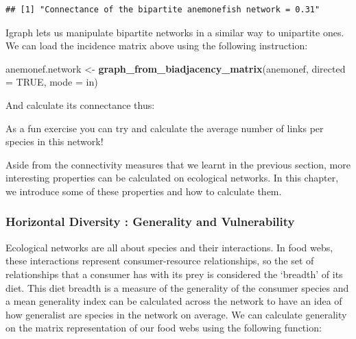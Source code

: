 \documentclass[
]{article}
\newenvironment{Shaded}{\begin{snugshade}}{\end{snugshade}}
\newcommand{\AttributeTok}[1]{\textcolor[rgb]{0.13,0.29,0.53}{#1}}
\newcommand{\CommentTok}[1]{\textcolor[rgb]{0.56,0.35,0.01}{\textit{#1}}}
\newcommand{\ConstantTok}[1]{\textcolor[rgb]{0.56,0.35,0.01}{#1}}
\newcommand{\FunctionTok}[1]{\textcolor[rgb]{0.13,0.29,0.53}{\textbf{#1}}}
\newcommand{\NormalTok}[1]{#1}
\newcommand{\OtherTok}[1]{\textcolor[rgb]{0.56,0.35,0.01}{#1}}
\newcommand{\SpecialCharTok}[1]{\textcolor[rgb]{0.81,0.36,0.00}{\textbf{#1}}}
\newcommand{\StringTok}[1]{\textcolor[rgb]{0.31,0.60,0.02}{#1}}
\begin{document}
\begin{verbatim}
## [1] "Connectance of the bipartite anemonefish network = 0.31"
\end{verbatim}

Igraph lets us manipulate bipartite networks in a similar way to
unipartite ones. We can load the incidence matrix above using the
following instruction:

\begin{Shaded}
\begin{Highlighting}[]
\NormalTok{anemonef.network }\OtherTok{\textless{}{-}} \FunctionTok{graph\_from\_biadjacency\_matrix}\NormalTok{(anemonef, }\AttributeTok{directed =} \ConstantTok{TRUE}\NormalTok{, }\AttributeTok{mode =} \StringTok{\textquotesingle{}in\textquotesingle{}}\NormalTok{)}
\end{Highlighting}
\end{Shaded}

And calculate its connectance thus:

\begin{Shaded}
\end{Shaded}

As a fun exercise you can try and calculate the average number of links
per species in this network!

Aside from the connectivity measures that we learnt in the previous
section, more interesting properties can be calculated on ecological
networks. In this chapter, we introduce some of these properties and how
to calculate them.

\subsubsection{Horizontal Diversity : Generality and
Vulnerability}\label{horizontal-diversity-generality-and-vulnerability}

Ecological networks are all about species and their interactions. In
food webs, these interactions represent consumer-resource relationships,
so the set of relationships that a consumer has with its prey is
considered the `breadth' of its diet. This diet breadth is a measure of
the generality of the consumer species and a mean generality index can
be calculated across the network to have an idea of how generalist are
species in the network on average. We can calculate generality on the
matrix representation of our food webs using the following function:
\end{document}
